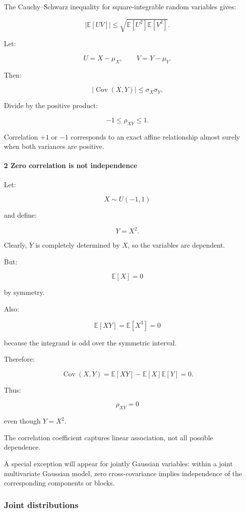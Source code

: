 The Cauchy--Schwarz inequality for square-integrable random variables gives:

\[
 |\mathbb E[UV]| \le \sqrt{\mathbb E[U^2]\mathbb E[V^2]}.
\]

Let:

\[
 U=X-\mu_X, \qquad V=Y-\mu_Y.
\]

Then:

\[
 |\operatorname{Cov}(X,Y)| \le \sigma_X\sigma_Y.
\]

Divide by the positive product:

\[
 \boxed{ -1\le\rho_{XY}\le1 }.
\]

Correlation \(+1\) or \(-1\) corresponds to an exact affine relationship almost surely when both variances are positive.

\paragraph{2 Zero correlation is not independence}\label{zero-correlation-is-not-independence}

Let:

\[
 X\sim U(-1,1)
\]

and define:

\[
 Y=X^2.
\]

Clearly, \(Y\) is completely determined by \(X\), so the variables are dependent.

But:

\[
 \mathbb E[X]=0
\]

by symmetry.

Also:

\[
 \mathbb E[XY] = \mathbb E[X^3]=0
\]

because the integrand is odd over the symmetric interval.

Therefore:

\[
 \operatorname{Cov}(X,Y) = \mathbb E[XY]-\mathbb E[X]\mathbb E[Y] =0.
\]

Thus:

\[
 \boxed{\rho_{XY}=0}
\]

even though \(Y=X^2\).

The correlation coefficient captures linear association, not all possible dependence.

A special exception will appear for jointly Gaussian variables: within a joint multivariate Gaussian model, zero cross-covariance implies independence of the corresponding components or blocks.

\subsubsection{Joint distributions}\label{joint-distributions}

